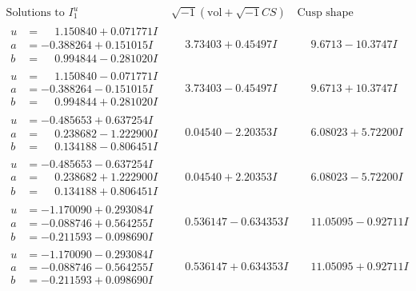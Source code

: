 \documentclass[1p]{elsarticle_modified}
\theoremstyle{definition}
\newcommand{\I}{\sqrt{-1}}
\begin{document}
$$\begin{array}{c|c|c}  
\text{Solutions to }I^u_{1}& \I (\text{vol} + \sqrt{-1}CS) & \text{Cusp shape}\\
 \hline 
\begin{aligned}
u &= \phantom{-}1.150840 + 0.071771 I \\
a &= -0.388264 + 0.151015 I \\
b &= \phantom{-}0.994844 - 0.281020 I\end{aligned}
 & \phantom{-}3.73403 + 0.45497 I & \phantom{-}9.6713 - 10.3747 I \\ \hline\begin{aligned}
u &= \phantom{-}1.150840 - 0.071771 I \\
a &= -0.388264 - 0.151015 I \\
b &= \phantom{-}0.994844 + 0.281020 I\end{aligned}
 & \phantom{-}3.73403 - 0.45497 I & \phantom{-}9.6713 + 10.3747 I \\ \hline\begin{aligned}
u &= -0.485653 + 0.637254 I \\
a &= \phantom{-}0.238682 - 1.222900 I \\
b &= \phantom{-}0.134188 - 0.806451 I\end{aligned}
 & \phantom{-}0.04540 - 2.20353 I & \phantom{-}6.08023 + 5.72200 I \\ \hline\begin{aligned}
u &= -0.485653 - 0.637254 I \\
a &= \phantom{-}0.238682 + 1.222900 I \\
b &= \phantom{-}0.134188 + 0.806451 I\end{aligned}
 & \phantom{-}0.04540 + 2.20353 I & \phantom{-}6.08023 - 5.72200 I \\ \hline\begin{aligned}
u &= -1.170090 + 0.293084 I \\
a &= -0.088746 + 0.564255 I \\
b &= -0.211593 - 0.098690 I\end{aligned}
 & \phantom{-}0.536147 - 0.634353 I & \phantom{-}11.05095 - 0.92711 I \\ \hline\begin{aligned}
u &= -1.170090 - 0.293084 I \\
a &= -0.088746 - 0.564255 I \\
b &= -0.211593 + 0.098690 I\end{aligned}
 & \phantom{-}0.536147 + 0.634353 I & \phantom{-}11.05095 + 0.92711 I \\ \hline\begin{aligned}

\end{aligned}
\end{array}$$
\end{document}
